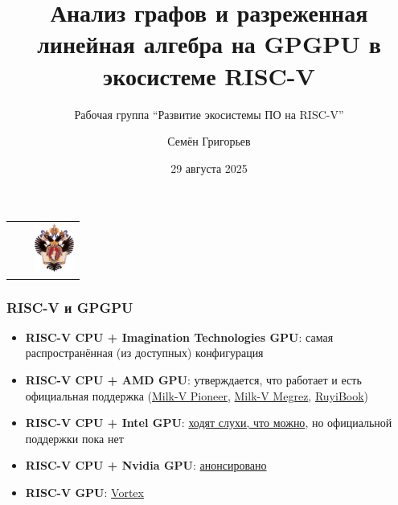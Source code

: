 \documentclass[xcolor=table,aspectratio=169]{beamer}
\title[GraphBLAS+RISC-V+GPGPU]{Анализ графов и разреженная линейная алгебра на GPGPU в экосистеме RISC-V}
\subtitle{Рабочая группа ``Развитие экосистемы ПО на RISC-V''}
\institute[СПбГУ]{
Санкт-Петербургский Государственный Университет
}
\author[Семён Григорьев]{Семён Григорьев}
\date{29 августа 2025}
\begin{document}
{
\begin{frame}[fragile]
  \begin{table}
  \centering
  \begin{tabularx}{\linewidth}{XcX}
    \hfill
    & 
    & \hfill \includegraphics[height=1.6cm]{pictures/SPbGU_Logo.png}
  \end{tabularx}
  \end{table}
  \titlepage
\end{frame}
}



\begin{frame}[fragile]
  \frametitle{RISC-V и GPGPU}
  \begin{itemize}
    \item \textbf{RISC-V CPU + Imagination Technologies GPU}: самая распространённая (из доступных) конфигурация
    \item \textbf{RISC-V CPU + AMD GPU}: утверждается, что работает и есть официальная поддержка (\href{https://milkv.io/pioneer}{Milk-V Pioneer}, \href{https://riscv.org/ecosystem-news/2024/10/risc-v-cpu-demoed-with-rx-7900-xtx-gpu-in-debian-linux-amd-flagship-gpu-paired-with-milk-v-megrez-board-and-sifive-p550-cores/}{Milk-V Megrez}, \href{https://milkv.io/ruyibook}{RuyiBook})
    \item \textbf{RISC-V CPU + Intel GPU}: \href{https://www.reddit.com/r/RISCV/comments/1ftep9u/intel_arc_a770_on_riscv/}{ходят слухи, что можно}, но официальной поддержки пока нет
    \item \textbf{RISC-V CPU + Nvidia GPU}: \href{https://riscv.org/ecosystem-news/2025/07/nvidia-to-bring-cuda-platform-support-to-the-risc-v/}{анонсировано}
    \item \textbf{RISC-V GPU}: \href{https://github.com/vortexgpgpu/vortex}{Vortex}
  \end{itemize}
\end{frame}
\end{document}
